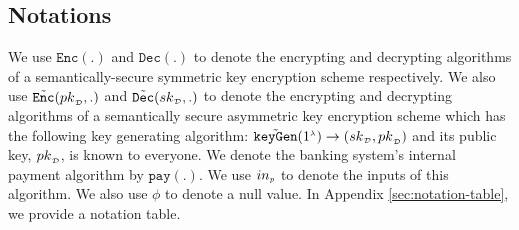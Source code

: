 \subsection{Notations}
We use $\mathtt{Enc}(.)$  and $\mathtt{Dec}(.)$ to denote the encrypting and decrypting algorithms of   a semantically-secure symmetric key encryption scheme respectively. We also use  ${ \tilde {\mathtt{Enc}}}({pk}_{\scriptscriptstyle\mathcal {D}}, .)$ and   ${\tilde{\mathtt {Dec}}}({sk}_{\scriptscriptstyle\mathcal {D}}, .)$ to denote the encrypting and decrypting algorithms of   a semantically secure asymmetric key encryption scheme  which has  the following key generating algorithm:  $\tilde{\mathtt{keyGen}}(1^{\scriptscriptstyle\lambda})\rightarrow({sk}_{\scriptscriptstyle\mathcal {D}}, {pk}_{\scriptscriptstyle\mathcal {D}})$ and its  public key, ${pk}_{\scriptscriptstyle\mathcal {D}}$, is known to everyone.  We denote the banking system's internal payment  algorithm by  $\mathtt{pay}(.)$.  We use $in_{\scriptscriptstyle p}$ to denote the inputs of this algorithm.  We also use $\phi$ to denote a null value. In Appendix \ref{sec:notation-table}, we provide a notation table. 








